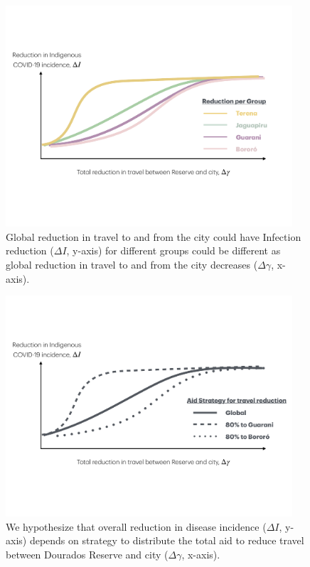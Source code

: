 \documentclass[
  letterpaper,
  abstract]{scrartcl}
\begin{document}
\begin{figure}[H]

\caption{Global reduction in travel to and from the city could have
Infection reduction ($\Delta I$, y-axis) for different groups could be
different as global reduction in travel to and from the city decreases
($\Delta \gamma$, x-axis).}
\label{fig:GlobalTravelReduction}
\vspace{0.3em}
{\centering \includegraphics[width=0.95\textwidth,height=\textheight]{Figures/ResultsSketch_ReductionByGroup.pdf}

}

\end{figure}%


\begin{figure}[H]

\caption{We hypothesize that overall reduction in disease incidence ($\Delta I$, y-axis)  depends on 
strategy to distribute the total aid to reduce travel between Dourados Reserve and city ($\Delta \gamma$, x-axis).}
\label{fig:GroupSpecificTravelReduction}
\vspace{0.3em}
{\centering \includegraphics[width=0.95\textwidth,height=\textheight]{Figures/ResultsSketch_ByStrategy.pdf}

}


\end{figure}%
\end{document}
